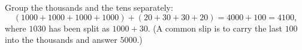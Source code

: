 Group the thousands and the tens separately:
\[(1000+1000+1000+1000)+(20+30+30+20)=4000+100=\boxed{4100},\]
where $1030$ has been split as $1000+30$. (A common slip is to carry the last $100$ into the thousands and answer $5000$.)
